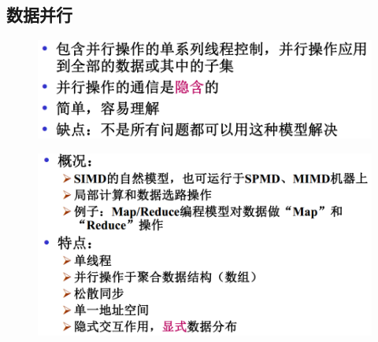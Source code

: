 \documentclass[UTF8,a4paper]{ctexart}
\begin{document}
\subsection{数据并行}
\begin{figure}[H]
  \centering
  \includegraphics[scale = 0.3]{assets/ParallelComputing_ee50f.png}
\end{figure}
\begin{figure}[H]
  \centering
  \includegraphics[scale = 0.3]{assets/ParallelComputing_7f0e2.png}
\end{figure}
\end{document}

